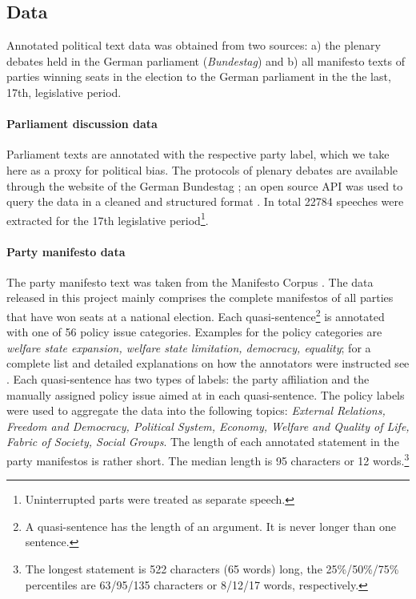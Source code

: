 \documentclass[11pt]{article}
\begin{document}
\subsection{Data}
Annotated political text data was obtained from two sources: a) the plenary debates held in the German parliament ({\em Bundestag}) and b) all manifesto texts of parties winning seats in the election to the German parliament in the the last, 17th, legislative period. 

\paragraph{Parliament discussion data} Parliament texts are annotated with the respective party label, which we take here as a proxy for political bias. The protocols of plenary debates are available through the website of the German Bundestag \cite{bundestag}; an open source API was used to query the data in a cleaned and structured format \cite{bundestag-github}. In total 22784 speeches were extracted for the 17th legislative period\footnote{Uninterrupted parts were treated as separate speech.}. 

\paragraph{Party manifesto data}
The party manifesto text was taken from the Manifesto Corpus  \cite{manifesto}. The data released in this project mainly comprises the complete manifestos of all parties that have won seats at a national election. Each quasi-sentence\footnote{A quasi-sentence has the length of an argument. It is never longer than one sentence.} is annotated with one of 56 policy issue categories. Examples for the policy categories are {\em welfare state expansion, welfare state limitation, democracy, equality}; for a complete list and detailed explanations on how the annotators were instructed see \cite{leftright}. Each quasi-sentence has  two types of labels: the party affiliation and the manually assigned policy issue aimed at in each quasi-sentence. The policy labels were used to aggregate the data into the following topics: {\em External Relations, Freedom and Democracy, Political System, Economy, Welfare and Quality of Life, Fabric of Society, Social Groups}. 
The length of each annotated statement in the party manifestos is rather short. The median length is 95 characters or 12 words.\footnote{The longest statement is 522 characters (65 words) long, the 25\%/50\%/75\% percentiles are 63/95/135 characters or 8/12/17 words, respectively.} 
\end{document}
